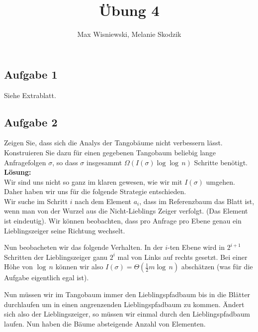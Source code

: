 \documentclass[11pt,a4paper,ngerman]{article}
\date{}
\title{Übung 4}
\author{Max Wisniewski, Melanie Skodzik}
\begin{document}

\renewcommand{\figurename}{Grafik}

\maketitle
\thispagestyle{fancy}


\subsection*{Aufgabe 1}

Siehe Extrablatt.

\subsection*{Aufgabe 2}

Zeigen Sie, dass sich die Analys der Tangobäume nicht verbessern lässt. Konstruieren Sie dazu für einen gegebenen Tangobaum beliebig lange Anfragefolgen $\sigma$, so dass $\sigma$ insgesammt $\Omega(I(\sigma) \log \log \, n)$ Schritte benötigt.\\

\noindent\textbf{Lösung:}\\

Wir sind uns nicht so ganz im klaren gewesen, wie wir mit $I(\sigma)$ umgehen. Daher haben wir uns für die folgende Strategie entschieden.\\

Wir suche im Schritt $i$ nach dem Element $a_i$, dass im Referenzbaum das Blatt ist, wenn man von der Wurzel aus die Nicht-Lieblings Zeiger verfolgt.
(Das Element ist eindeutig). Wir können beobachten, dass pro Anfrage pro Ebene genau ein Lieblingszeiger seine Richtung wechselt.

Nun beobacheten wir das folgende Verhalten. In der $i$-ten Ebene wird in $2^{i+1}$ Schritten der Lieblingszeiger ganu $2^i$ mal von Links auf rechts gesetzt. Bei einer Höhe von $\log \, n$ können wir also $I(\sigma) = \Theta(\frac{1}{2} m \log \, n)$ abschätzen (was für die Aufgabe eigentlich egal ist).

Nun müssen wir im Tangobaum immer den Lieblingspfadbaum bis in die Blätter durchlaufen um in einen angrenzenden Lieblingspfadbaum zu kommen. Ändert sich also der Lieblingszeiger, so müssen wir einmal durch den Lieblingspfadbaum laufen. Nun haben die Bäume absteigende Anzahl von Elementen.
\end{document}
